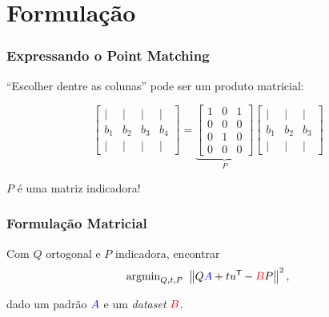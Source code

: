 \section{Formulação}

\begin{frame}[fragile]
  \frametitle{Expressando o Point Matching}
  \begin{center}
    ``Escolher dentre as colunas'' pode ser um produto matricial:

    \[
      \begin{bmatrix}
        \vert & \vert & \vert & \vert \\
        b_1 & b_2 & b_3 & b_4 \\
        \vert & \vert & \vert & \vert
      \end{bmatrix}
      =
      \underbrace{\begin{bmatrix}
        1 & 0 & 1 \\
        0 & 0 & 0 \\
        0 & 1 & 0 \\
        0 & 0 & 0
      \end{bmatrix}}_{P}
      \begin{bmatrix}
        \vert & \vert & \vert \\
        b_1 & b_2 & b_3 \\
        \vert & \vert & \vert
      \end{bmatrix}
    \]

    $P$ é uma matriz indicadora!
  \end{center}
\end{frame}

\begin{frame}
  \frametitle{Formulação Matricial}
  \begin{center}
    Com $Q$ ortogonal e $P$ indicadora, encontrar
    \[\text{argmin}_{Q,t,P}\,\, \left\lVert Q\textcolor{blue}{A} + t u^{\mathsf{T}\mkern-1mu} - \textcolor{red}{B}P\right\rVert^2,\]

    dado um padrão $\textcolor{blue}{A}$ e um \textit{dataset} $\textcolor{red}{B}$.
  \end{center}
\end{frame}
